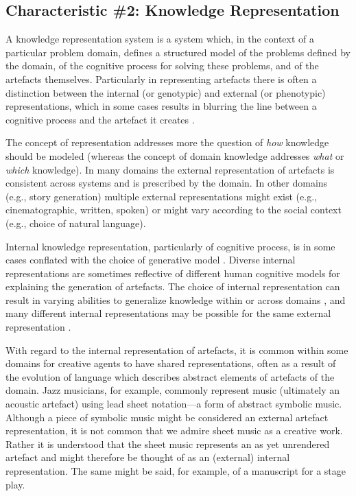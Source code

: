 \documentclass[phd,electronic,oneside,twosidetoc,letterpaper,chaptercenter,parttop,lof,lot]{byumsphd}
\begin{document}
\subsection{Characteristic \#2: Knowledge Representation}

A knowledge representation system is a system which, in the context of a particular problem domain, defines a structured model of the problems defined by the domain, of the cognitive process for solving these problems, and of the artefacts themselves. Particularly in representing artefacts there is often a distinction between the internal (or genotypic) and external (or phenotypic) representations, which in some cases results in blurring the line between a cognitive process and the artefact it creates \citep{Ventura2017HowSystem}.

The concept of representation addresses more the question of \textit{how} knowledge should be modeled (whereas the concept of domain knowledge addresses \textit{what} or \textit{which} knowledge). In many domains the external representation of artefacts is consistent across systems and is prescribed by the domain. In other domains (e.g., story generation) multiple external representations might exist (e.g., cinematographic, written, spoken) or might vary according to the social context (e.g., choice of natural language). 

Internal knowledge representation, particularly of cognitive process, is in some cases conflated with the choice of generative model \citep{Ventura2017HowSystem}. Diverse internal representations are sometimes reflective of different human cognitive models for explaining the generation of artefacts. The choice of internal representation can result in varying abilities to generalize knowledge within or across domains \citep{Lake2015}, and many different internal representations may be possible for the same external representation \citep{Ventura2016}.

With regard to the internal representation of artefacts, it is common within some domains for creative agents to have shared representations, often as a result of the evolution of language which describes abstract elements of artefacts of the domain. Jazz musicians, for example, commonly represent music (ultimately an acoustic artefact) using lead sheet notation---a form of abstract symbolic music. Although a piece of symbolic music might be considered an external artefact representation, it is not common that we admire sheet music as a creative work. Rather it is understood that the sheet music represents an as yet unrendered artefact and might therefore be thought of as an (external) internal representation. The same might be said, for example, of a manuscript for a stage play.
\end{document}
